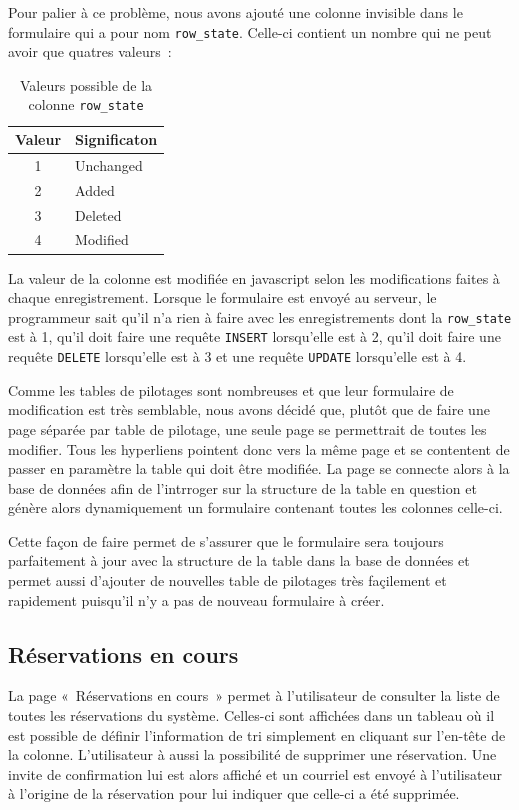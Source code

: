 \documentclass[letter, 11pt]{report}
\begin{document}
Pour palier à ce problème, nous avons ajouté une colonne invisible dans le formulaire qui a pour nom \texttt{row\_state}. Celle-ci contient un nombre qui ne peut avoir que quatres valeurs~:

\begin{table}[htbp]
	\caption{Valeurs possible de la colonne \texttt{row\_state}}
	\begin{center}
		\begin{tabular}{|c|l|}
			\hline
			Valeur & Significaton \\
			\hline
			1      & Unchanged \\
			2      & Added \\
			3      & Deleted \\
			4      & Modified \\
			\hline
		\end{tabular}
	\end{center}
\end{table}

La valeur de la colonne est modifiée en javascript selon les modifications faites à chaque enregistrement. Lorsque le formulaire est envoyé au serveur, le programmeur sait qu'il n'a rien à faire avec les enregistrements dont la \texttt{row\_state} est à 1, qu'il doit faire une requête \texttt{INSERT} lorsqu'elle est à 2, qu'il doit faire une requête \texttt{DELETE} lorsqu'elle est à 3 et une requête \texttt{UPDATE} lorsqu'elle est à 4.

Comme les tables de pilotages sont nombreuses et que leur formulaire de modification est très semblable, nous avons décidé que, plutôt que de faire une page séparée par table de pilotage, une seule page se permettrait de toutes les modifier. Tous les hyperliens pointent donc vers la même page et se contentent de passer en paramètre la table qui doit être modifiée. La page se connecte alors à la base de données afin de l'intrroger sur la structure de la table en question et génère alors dynamiquement un formulaire contenant toutes les colonnes celle-ci.

Cette façon de faire permet de s'assurer que le formulaire sera toujours parfaitement à jour avec la structure de la table dans la base de données et permet aussi d'ajouter de nouvelles table de pilotages très façilement et rapidement puisqu'il n'y a pas de nouveau formulaire à créer.

\subsection{Réservations en cours}
La page «~Réservations en cours~» permet à l'utilisateur de consulter la liste de toutes les réservations du système. Celles-ci sont affichées dans un tableau où il est possible de définir l'information de tri simplement en cliquant sur l'en-tête de la colonne. L'utilisateur à aussi la possibilité de supprimer une réservation. Une invite de confirmation lui est alors affiché et un courriel est envoyé à l'utilisateur à l'origine de la réservation pour lui indiquer que celle-ci a été supprimée.
\end{document}
